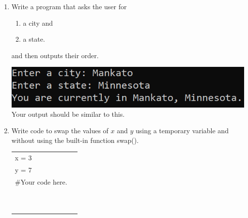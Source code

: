 \documentclass{article}
\begin{document}
\begin{enumerate}

	\item 
		Write a program that asks the user for \\
		\begin{minipage}{0.5\textwidth}
		\vspace*{-0.5em}
			\begin{enumerate}  \setlength\itemsep{-0.3em}
				\item a city and
				\item a state.  
			\end{enumerate} \vspace*{-1ex}
		and then outputs their order.
		\end{minipage}
		\begin{minipage}{0.5\textwidth}
			\centering
			\includegraphics[scale=0.75]{./imgs/locationOutput.png}\\
			Your output should be similar to this.
		\end{minipage}

	\item 
		Write code to swap the values of $x$ and $y$ using a temporary variable and without using
		the built-in function swap().\\		
		\begin{tabular}{|ll}
			\\			
			x = 3\\
			y = 7\\[5pt]
			\#Your code here. \\[5pt]
			& \\ & \\ & \\ & \\ & \\ & \\ & \\ & \\ & \\ & \\ 
		\end{tabular}


\end{enumerate}
\end{document}
